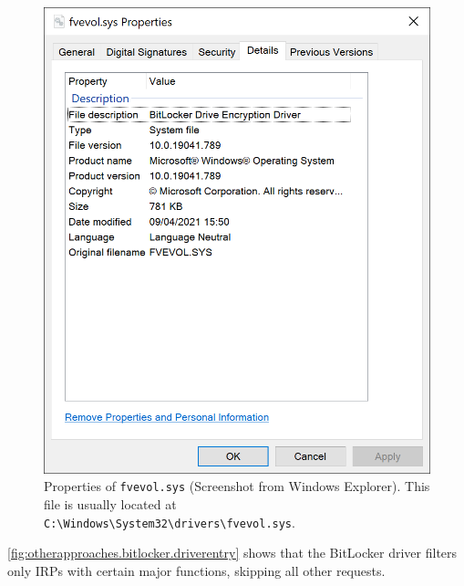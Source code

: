 \begin{figure}[htb!]
	\center
	\includegraphics[scale=0.7]{../img/otherapproaches.bitlocker.fvevol.png}
	\caption[
		Properties of \texttt{fvevol.sys}
	]{
		Properties of \texttt{fvevol.sys} (Screenshot from Windows Explorer). This file is usually located at \texttt{C:\textbackslash Windows\textbackslash System32\textbackslash drivers\textbackslash fvevol.sys}.
	}
	\label{fig:otherapproaches.bitlocker.fvevol}
\end{figure}

\autoref{fig:otherapproaches.bitlocker.driverentry} shows that the BitLocker driver filters only IRPs with certain major functions, skipping all other requests.


